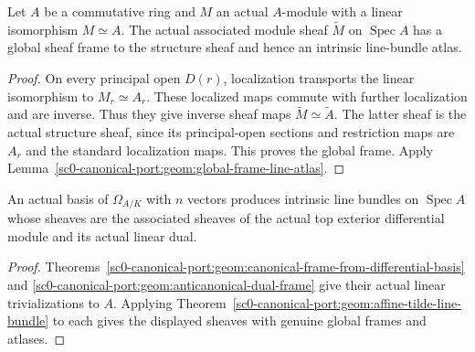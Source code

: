 \begin{theorem}
\label{sc0-canonical-port:geom:affine-tilde-line-bundle}
\leanok
Let \(A\) be a commutative ring and \(M\) an actual
\(A\)-module with a linear isomorphism \(M\simeq A\).
The actual associated module sheaf \(\widetilde M\) on
\(\operatorname{Spec}A\) has a global sheaf frame to the
structure sheaf and hence an intrinsic line-bundle atlas.
\end{theorem}
\begin{proof}
On every principal open \(D(r)\), localization transports the
linear isomorphism to \(M_r\simeq A_r\). These localized maps
commute with further localization and are inverse. Thus they
give inverse sheaf maps \(\widetilde M\simeq\widetilde A\).
The latter sheaf is the actual structure sheaf, since its
principal-open sections and restriction maps are \(A_r\) and
the standard localization maps. This proves the global frame.
Apply Lemma~\ref{sc0-canonical-port:geom:global-frame-line-atlas}.
\end{proof}

\begin{corollary}
\label{sc0-canonical-port:geom:affine-canonical-line-sheaves}
\leanok
An actual basis of \(\Omega_{A/K}\) with \(n\) vectors
produces intrinsic line bundles on \(\operatorname{Spec}A\)
whose sheaves are the associated sheaves of the actual top
exterior differential module and its actual linear dual.
\end{corollary}
\begin{proof}
Theorems~\ref{sc0-canonical-port:geom:canonical-frame-from-differential-basis}
and \ref{sc0-canonical-port:geom:anticanonical-dual-frame} give their actual linear
trivializations to \(A\). Applying
Theorem~\ref{sc0-canonical-port:geom:affine-tilde-line-bundle} to each gives the
displayed sheaves with genuine global frames and atlases.
\end{proof}

